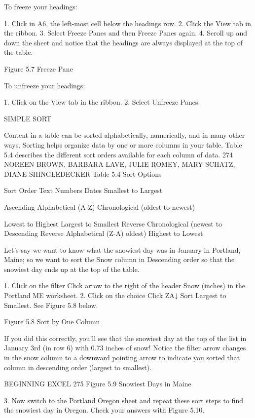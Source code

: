 To freeze your headings:

1.   Click in A6, the left-most cell below the headings row.
2.   Click the View tab in the ribbon.
3.   Select Freeze Panes and then Freeze Panes again.
4.   Scroll up and down the sheet and notice that the headings are always displayed at the top of the
table.




Figure 5.7 Freeze Pane


To unfreeze your headings:

1. Click on the View tab in the ribbon.
2. Select Unfreeze Panes.

SIMPLE SORT

Content in a table can be sorted alphabetically, numerically, and in many other ways. Sorting helps
organize data by one or more columns in your table. Table 5.4 describes the different sort orders
available for each column of data.
274 NOREEN BROWN, BARBARA LAVE, JULIE ROMEY, MARY SCHATZ, DIANE SHINGLEDECKER
Table 5.4 Sort Options

Sort Order     Text                     Numbers               Dates
Smallest to Largest

Ascending      Alphabetical (A-Z)                             Chronological (oldest to newest)

Lowest to Highest
Largest to Smallest
Reverse Chronological (newest to
Descending Reverse Alphabetical (Z-A)
oldest)
Highest to Lowest


Let’s say we want to know what the snowiest day was in January in Portland, Maine; so we want to
sort the Snow column in Descending order so that the snowiest day ends up at the top of the table.

1. Click on the filter Click arrow to the right of the header Snow (inches) in the Portland ME
worksheet.
2. Click on the choice Click ZA↓ Sort Largest to Smallest. See Figure 5.8 below.




Figure 5.8 Sort by One Column


If you did this correctly, you’ll see that the snowiest day at the top of the list in January 3rd (in row 6)
with 0.73 inches of snow! Notice the filter arrow changes in the snow column to a downward
pointing arrow to indicate you sorted that column in descending order (largest to smallest).




BEGINNING EXCEL 275
Figure 5.9 Snowiest Days in Maine


3. Now switch to the Portland Oregon sheet and repeat these sort steps to find the snowiest day in
Oregon. Check your answers with Figure 5.10.




